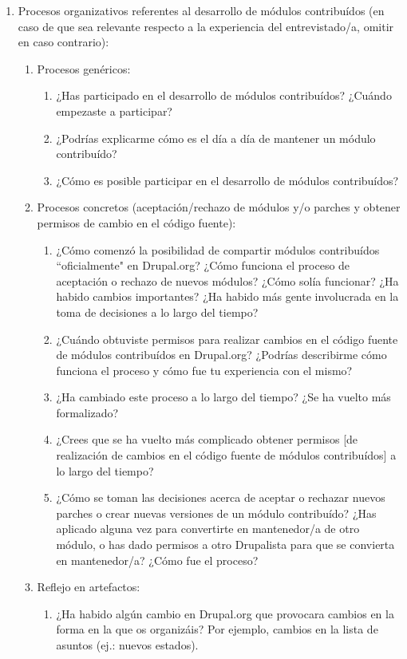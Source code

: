 \begin{enumerate}
		
	\item Procesos organizativos referentes al desarrollo de módulos contribuídos (en caso de que sea relevante respecto a la experiencia del entrevistado/a, omitir en caso contrario):
		\begin{enumerate}
			\item Procesos genéricos:
			\begin{enumerate}
				\item ¿Has participado en el desarrollo de módulos contribuídos? ¿Cuándo empezaste a participar?
				\item ¿Podrías explicarme cómo es el día a día de mantener un módulo contribuído?
				\item ¿Cómo es posible participar en el desarrollo de módulos contribuídos?
			\end{enumerate}	
			\item Procesos concretos (aceptación/rechazo de módulos y/o parches y obtener permisos de cambio en el código fuente):
			\begin{enumerate}
				\item ¿Cómo comenzó la posibilidad de compartir módulos contribuídos ``oficialmente" en Drupal.org? ¿Cómo funciona el proceso de aceptación o rechazo de nuevos módulos? ¿Cómo solía funcionar? ¿Ha habido cambios importantes? ¿Ha habido más gente involucrada en la toma de decisiones a lo largo del tiempo?
				\item ¿Cuándo obtuviste permisos para realizar cambios en el código fuente de módulos contribuídos en Drupal.org? ¿Podrías describirme cómo funciona el proceso y cómo fue tu experiencia con el mismo?
				\item ¿Ha cambiado este proceso a lo largo del tiempo? ¿Se ha vuelto más formalizado?
				\item ¿Crees que se ha vuelto más complicado obtener permisos [de realización de cambios en el código fuente de módulos contribuídos] a lo largo del tiempo?
				\item ¿Cómo se toman las decisiones acerca de aceptar o rechazar nuevos parches o crear nuevas versiones de un módulo contribuído? ¿Has aplicado alguna vez para convertirte en mantenedor/a de otro módulo, o has dado permisos a otro Drupalista para que se convierta en mantenedor/a? ¿Cómo fue el proceso?
			\end{enumerate}

			\item Reflejo en artefactos:
			\begin{enumerate}		
				\item ¿Ha habido algún cambio en Drupal.org que provocara cambios en la forma en la que os organizáis? Por ejemplo, cambios en la lista de asuntos (ej.: nuevos estados).
			\end{enumerate}
	\end{enumerate}


\end{enumerate}

